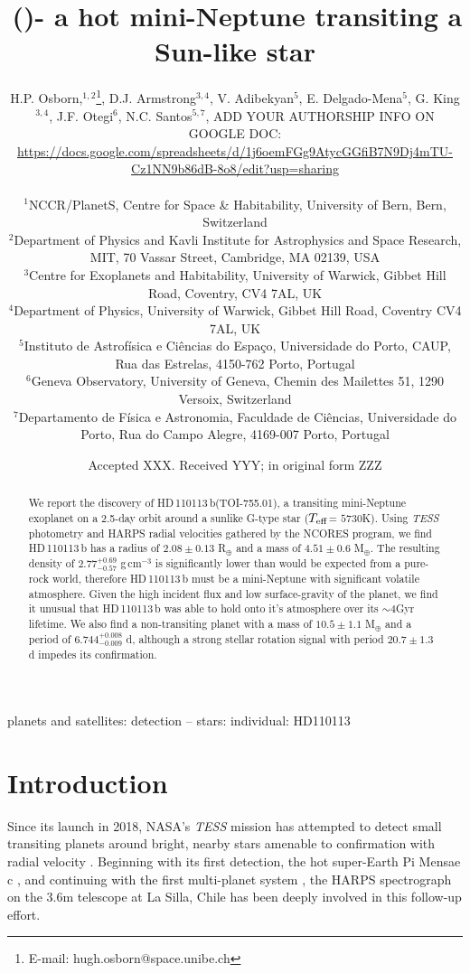 \documentclass[fleqn,usenatbib]{mnras}
\title[\Tplanet]{\Tplanet\,(\TTplanet)- a hot mini-Neptune transiting a Sun-like star}
\author[H.P. Osborn et al.]{
\parbox{\textwidth}{H.P. Osborn,$^{{1},{2}}$\thanks{E-mail: hugh.osborn@space.unibe.ch},
D.J. Armstrong$^{3,4}$, %
V. Adibekyan$^{5}$, %
E. Delgado-Mena$^{5}$,
G. King$^{3,4}$, %
J.F. Otegi$^{6}$, %
N.C. Santos$^{5,7}$, %
ADD YOUR AUTHORSHIP INFO ON GOOGLE DOC: {\small \url{https://docs.google.com/spreadsheets/d/1j6oemFGg9AtycGGfiB7N9Dj4mTU-Cz1NN9b86dB-8o8/edit?usp=sharing}}
}\\
$^{1}$NCCR/PlanetS, Centre for Space \& Habitability, University of Bern, Bern, Switzerland\\
$^{2}$Department of Physics and Kavli Institute for Astrophysics and Space Research, MIT, 70 Vassar Street, Cambridge, MA 02139, USA\\
$^{3}$Centre for Exoplanets and Habitability, University of Warwick, Gibbet Hill Road, Coventry, CV4 7AL, UK\\
$^{4}$Department of Physics, University of Warwick, Gibbet Hill Road, Coventry CV4 7AL, UK \\
$^{5}$Instituto de Astrof\'isica e Ci\^encias do Espa\c{c}o, Universidade do Porto, CAUP, Rua das Estrelas, 4150-762 Porto, Portugal\\
$^{6}$Geneva Observatory, University of Geneva, Chemin des Mailettes 51, 1290 Versoix, Switzerland\\
$^{7}$Departamento de F\'isica e Astronomia, Faculdade de Ci\^{e}ncias, Universidade do Porto, Rua do Campo Alegre, 4169-007 Porto, Portugal\\
}
\date{Accepted XXX. Received YYY; in original form ZZZ}
\newcommand{\gcm}{g\,cm$^{-3}$}	%
\newcommand{\tess}{{\it TESS}}
\newcommand{\harps}{{HARPS}}
\newcommand{\rearth}{R$_{\oplus}$}
\newcommand{\mearth}{M$_{\oplus}$}
\newcommand{\teff}{$T_{\rm eff}$}
\newcommand{\TPone}{ $ 6.744^{+0.008}_{-0.009} $ }
\newcommand{\TMpzero}{ $ 4.51 \pm 0.6 $ }
\newcommand{\TMpone}{ $ 10.5 \pm 1.1 $ }
\newcommand{\Trpl}{ $ 2.08 \pm 0.13 $ }
\newcommand{\Trhopgcmthree}{ $ 2.77^{+0.69}_{-0.57} $ }
\newcommand{\Tperiod}{ $ 20.7 \pm 1.3 $ }
\newcommand{\TTplanet}{TOI-755.01}
\newcommand{\Tplanet}{HD\,110113\,b}
\begin{document}
\label{firstpage}
\pagerange{\pageref{firstpage}--\pageref{lastpage}}
\maketitle

\begin{abstract}
We report the discovery of \Tplanet{}(\TTplanet{}), a transiting mini-Neptune exoplanet on a 2.5-day orbit around a sunlike G-type star (\teff{}= $5730$K).
Using \tess{} photometry and \harps{} radial velocities gathered by the NCORES program, we find \Tplanet{} has a radius of \Trpl{}\rearth{} and a mass of \TMpzero{} \mearth{}.
The resulting density of \Trhopgcmthree{}\gcm{} is significantly lower than would be expected from a pure-rock world, therefore \Tplanet{} must be a mini-Neptune with significant volatile atmosphere.
Given the high incident flux and low surface-gravity of the planet, we find it unusual that \Tplanet{} was able to hold onto it's atmosphere over its $\sim4$Gyr lifetime.
We also find a non-transiting planet with a mass of \TMpone{} \mearth{} and a period of \TPone{}d, although a strong stellar rotation signal with period \Tperiod{}d impedes its confirmation.
\end{abstract}

\begin{keywords}
planets and satellites: detection -- stars: individual: HD110113
\end{keywords}



\section{Introduction}
Since its launch in 2018, NASA's \tess{} mission has attempted to detect small transiting planets around bright, nearby stars amenable to confirmation with radial velocity \citep{ricker2010transiting}.
Beginning with its first detection, the hot super-Earth Pi Mensae c \citep{huang2018tess}, and continuing with the first multi-planet system \citep[TOI-125][]{quinn2019near,nielsen2020mass}, the \harps{} spectrograph on the 3.6m telescope at La Silla, Chile \citep{2003Msngr.114...20M} has been deeply involved in this follow-up effort.
\end{document}
